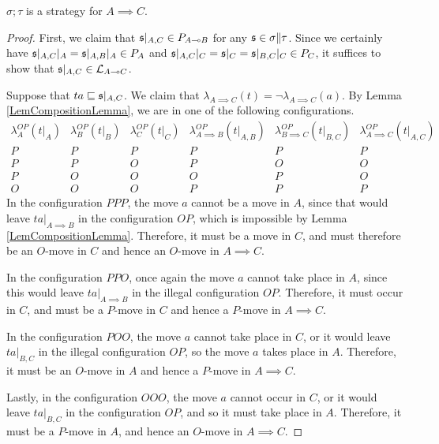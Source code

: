 \begin{proposition}
  $\sigma;\tau$ is a strategy for $A\implies C$.  
  \label{PropComposition}
\end{proposition}
\begin{proof}
  First, we claim that $\mathfrak s\vert_{A,C}\in P_{A\multimap B}$ for any $\mathfrak s\in \sigma\|\tau$.
  Since we certainly have $\mathfrak s\vert_{A,C}\vert_A = \mathfrak s\vert_{A,B}\vert_A\in P_A$ and $\mathfrak s\vert_{A,C}\vert_C = \mathfrak s\vert_C = \mathfrak s\vert_{B,C}\vert_C\in P_C$, it suffices to show that $\mathfrak s\vert_{A,C}\in \mathcal L_{A\multimap C}$.

  Suppose that $ta\sqsubseteq \mathfrak s\vert_{A,C}$.  We claim that $\lambda_{A\implies C}(t) = \neg\lambda_{A\implies C}(a)$.
  By Lemma \ref{LemCompositionLemma}, we are in one of the following configurations.
  \small
  \[
    \begin{array}{ccc|ccc}
      \lambda_A^{OP}(t\vert_A) & \lambda_B^{OP}(t\vert_B) & \lambda_C^{OP}(t\vert_C) & \lambda_{A\implies B}^{OP}(t\vert_{A,B}) & \lambda_{B\implies C}^{OP}(t\vert_{B,C}) & \lambda_{A\implies C}^{OP}(t\vert_{A,C}) \\
      \hline
      P & P & P & P & P & P \\
      P & P & O & P & O & O \\
      P & O & O & O & P & O \\
      O & O & O & P & P & P 
    \end{array}
    \]
  \normalsize
  In the configuration $PPP$, the move $a$ cannot be a move in $A$, since that would leave $ta\vert_{A\implies B}$ in the configuration $OP$, which is impossible by Lemma \ref{LemCompositionLemma}.  
  Therefore, it must be a move in $C$, and must therefore be an $O$-move in $C$ and hence an $O$-move in $A\implies C$.

  In the configuration $PPO$, once again the move $a$ cannot take place in $A$, since this would leave $ta\vert_{A\implies B}$ in the illegal configuration $OP$.
  Therefore, it must occur in $C$, and must be a $P$-move in $C$ and hence a $P$-move in $A\implies C$.

  In the configuration $POO$, the move $a$ cannot take place in $C$, or it would leave $ta\vert_{B,C}$ in the illegal configuration $OP$, so the move $a$ takes place in $A$.  
  Therefore, it must be an $O$-move in $A$ and hence a $P$-move in $A\implies C$.  

  Lastly, in the configuration $OOO$, the move $a$ cannot occur in $C$, or it would leave $ta\vert_{B,C}$ in the configuration $OP$, and so it must take place in $A$.  
  Therefore, it must be a $P$-move in $A$, and hence an $O$-move in $A\implies C$.


\end{proof}
